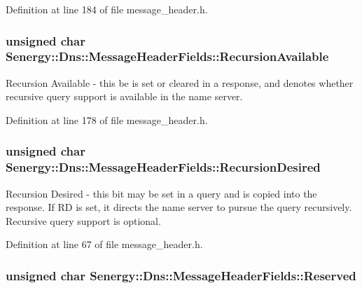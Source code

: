 Definition at line 184 of file message\-\_\-header.\-h.

\hypertarget{struct_senergy_1_1_dns_1_1_message_header_fields_afbb68b60a28f855e64eb13615fc2633e}{
\subsubsection[{Recursion\-Available}]{\setlength{\rightskip}{0pt plus 5cm}unsigned char Senergy\-::\-Dns\-::\-Message\-Header\-Fields\-::\-Recursion\-Available}}\label{struct_senergy_1_1_dns_1_1_message_header_fields_afbb68b60a28f855e64eb13615fc2633e}


Recursion Available -\/ this be is set or cleared in a response, and denotes whether recursive query support is available in the name server. 



Definition at line 178 of file message\-\_\-header.\-h.

\hypertarget{struct_senergy_1_1_dns_1_1_message_header_fields_ab5d7c8933016bb7288462b4a0ac131a5}{
\subsubsection[{Recursion\-Desired}]{\setlength{\rightskip}{0pt plus 5cm}unsigned char Senergy\-::\-Dns\-::\-Message\-Header\-Fields\-::\-Recursion\-Desired}}\label{struct_senergy_1_1_dns_1_1_message_header_fields_ab5d7c8933016bb7288462b4a0ac131a5}


Recursion Desired -\/ this bit may be set in a query and is copied into the response. If R\-D is set, it directs the name server to pursue the query recursively. Recursive query support is optional. 



Definition at line 67 of file message\-\_\-header.\-h.

\hypertarget{struct_senergy_1_1_dns_1_1_message_header_fields_afb988d15085d4f740df367d1792440c7}{
\subsubsection[{Reserved}]{\setlength{\rightskip}{0pt plus 5cm}unsigned char Senergy\-::\-Dns\-::\-Message\-Header\-Fields\-::\-Reserved}}\label{struct_senergy_1_1_dns_1_1_message_header_fields_afb988d15085d4f740df367d1792440c7}


